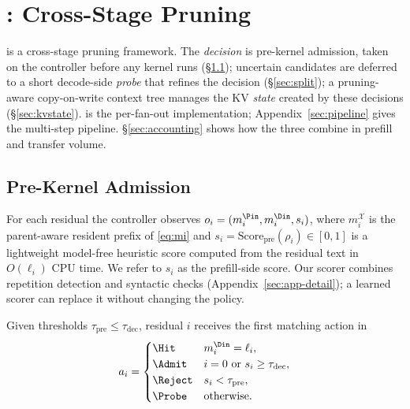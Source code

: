 \section{\sys: Cross-Stage Pruning}
\label{sec:design}

\sys is a cross-stage pruning framework.
The \emph{decision} is pre-kernel admission, taken on the controller before any kernel runs (\S\ref{sec:app}); uncertain candidates are deferred to a short decode-side \emph{probe} that refines the decision (\S\ref{sec:split}); a pruning-aware copy-on-write context tree manages the KV \emph{state} created by these decisions (\S\ref{sec:kvstate}).
 is the per-fan-out implementation; Appendix~\ref{sec:pipeline} gives the multi-step pipeline.
\S\ref{sec:accounting} shows how the three combine in prefill and transfer volume.

\subsection{Pre-Kernel Admission}
\label{sec:app}

For each residual the controller observes $o_i=(m_i^{\Pin},m_i^{\Din},s_i)$, where $m_i^{\mathcal{X}}$ is the parent-aware resident prefix of \eqref{eq:mi} and $s_i=\mathrm{Score}_{\mathrm{pre}}(\rho_i)\in[0,1]$ is a lightweight model-free heuristic score computed from the residual text in $O(\ell_i)$ CPU time.
We refer to $s_i$ as the prefill-side score.
Our scorer combines repetition detection and syntactic checks (Appendix~\ref{sec:app-detail}); a learned scorer can replace it without changing the policy.

\begin{definition}
\label{def:action}
Given thresholds $\tau_{\mathrm{pre}}\le\tau_{\mathrm{dec}}$, residual $i$ receives the first matching action in
\begin{equation}
\label{eq:action}
a_i=
\begin{cases}
\Hit & m_i^{\Din}=\ell_i,\\
\Admit & i=0\ \text{or}\ s_i\ge\tau_{\mathrm{dec}},\\
\Reject & s_i<\tau_{\mathrm{pre}},\\
\Probe & \text{otherwise}.
\end{cases}
\end{equation}
\end{definition}

